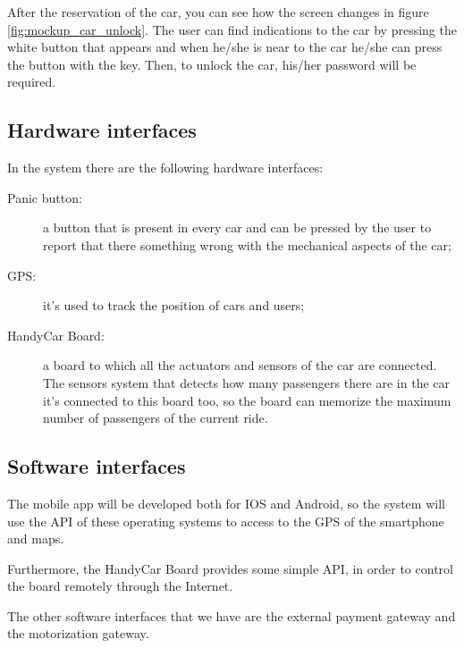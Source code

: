 After the reservation of the car, you can see how the screen changes in figure \ref{fig:mockup_car_unlock}. The user can find indications to the car by pressing the white button that appears and when he/she is near to the car he/she can press the button with the key. Then, to unlock the car, his/her password will be required.

\subsection{Hardware interfaces}
In the system there are the following hardware interfaces:
\begin{description}
	\item [Panic button:] a button that is present in every car and can be pressed by the user to report that there something wrong with the mechanical aspects of the car;
	\item [GPS:] it's used to track the position of cars and users;
	\item [HandyCar Board:] a board to which all the actuators and sensors of the car are connected. The sensors system that detects how many passengers there are in the car it's connected to this board too, so the board can memorize the maximum number of passengers of the current ride.
\end{description}

\subsection{Software interfaces}
The mobile app will be developed both for IOS and Android, so the system will use the API of these operating systems to access to the GPS of the smartphone and maps.

Furthermore, the HandyCar Board provides some simple API, in order to control the board remotely through the Internet.

The other software interfaces that we have are the external payment	gateway and the motorization gateway.




